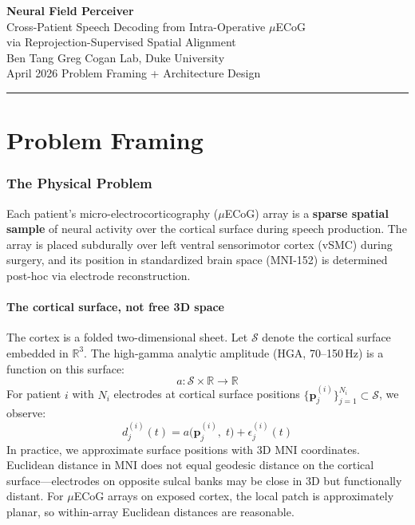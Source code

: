 \documentclass[11pt,letterpaper]{article}
\newcommand{\bfp}{\mathbf{p}}
\newcommand{\cS}{\mathcal{S}}
\newcommand{\R}{\mathbb{R}}
\begin{document}
\begin{center}
{\LARGE\bfseries Neural Field Perceiver}\\[6pt]
{\large Cross-Patient Speech Decoding from Intra-Operative $\mu$ECoG\\via Reprojection-Supervised Spatial Alignment}\\[12pt]
{\normalsize Ben Tang \quad\textbar\quad Greg Cogan Lab, Duke University}\\[4pt]
{\normalsize April 2026 \quad\textbar\quad Problem Framing + Architecture Design}
\end{center}

\medskip\noindent\rule{\textwidth}{0.4pt}\medskip

\tableofcontents
\newpage


\part{Problem Framing}

\section{The Physical Problem}

Each patient's micro-electrocorticography ($\mu$ECoG) array is a \textbf{sparse spatial sample} of neural activity over the cortical surface during speech production. The array is placed subdurally over left ventral sensorimotor cortex (vSMC) during surgery, and its position in standardized brain space (MNI-152) is determined post-hoc via electrode reconstruction.

\subsection{The cortical surface, not free 3D space}

The cortex is a folded two-dimensional sheet. Let $\cS$ denote the cortical surface embedded in $\R^3$. The high-gamma analytic amplitude (HGA, 70--150\,Hz) is a function on this surface:
\begin{equation}
a: \cS \times \R \to \R
\end{equation}
For patient $i$ with $N_i$ electrodes at cortical surface positions $\{\bfp_j^{(i)}\}_{j=1}^{N_i} \subset \cS$, we observe:
\begin{equation}\label{eq:observation}
d_j^{(i)}(t) = a\bigl(\bfp_j^{(i)},\; t\bigr) + \epsilon_j^{(i)}(t)
\end{equation}
In practice, we approximate surface positions with 3D MNI coordinates. Euclidean distance in MNI does not equal geodesic distance on the cortical surface---electrodes on opposite sulcal banks may be close in 3D but functionally distant. For $\mu$ECoG arrays on exposed cortex, the local patch is approximately planar, so within-array Euclidean distances are reasonable.
\end{document}
